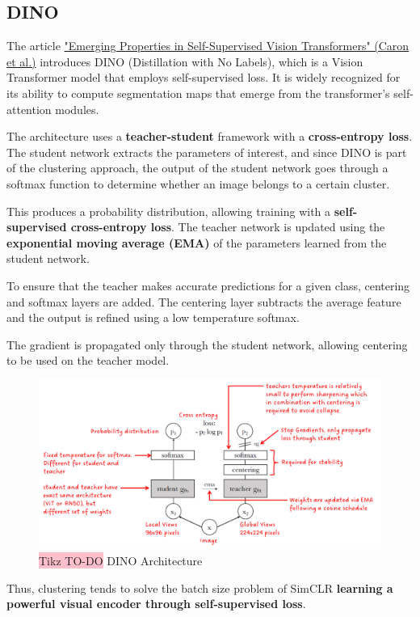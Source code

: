 \subsection{DINO}

The article \href{https://arxiv.org/pdf/2104.14294}{"Emerging Properties in Self-Supervised Vision Transformers" (Caron et al.)} introduces DINO (Distillation with No Labels), which is a Vision Transformer model that employs self-supervised loss. It is widely recognized for its ability to compute segmentation maps that emerge from the transformer's self-attention modules.

The architecture uses a \textbf{teacher-student} framework with a \textbf{cross-entropy loss}. The student network extracts the parameters of interest, and since DINO is part of the clustering approach, the output of the student network goes through a softmax function to determine whether an image belongs to a certain cluster.

This produces a probability distribution, allowing training with a \textbf{self-supervised cross-entropy loss}. The teacher network is updated using the \textbf{exponential moving average (EMA)} of the parameters learned from the student network.

To ensure that the teacher makes accurate predictions for a given class, centering and softmax layers are added. The centering layer subtracts the average feature and the output is refined using a low temperature softmax.

The gradient is propagated only through the student network, allowing centering to be used on the teacher model.

\begin{figure}[!htbp]
    \centering
    \includegraphics[width=0.75\linewidth]{tikz/chapter11 - DINO.png}
    \caption{{\color{red}\colorbox{pink}{Tikz TO-DO}} DINO Architecture}
\end{figure}

Thus, clustering tends to solve the batch size problem of SimCLR \textbf{learning a powerful visual encoder through self-supervised loss}.


